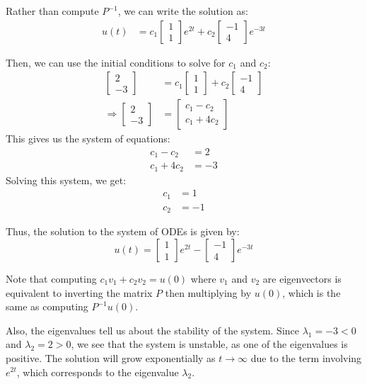 {Rather than compute $P^{-1}$, we can write the solution as:
\begin{align*}
u(t) &=
c_1 
\begin{bmatrix}
1 \\
1
\end{bmatrix}
e^{2t} +
c_2
\begin{bmatrix}
-1 \\
4
\end{bmatrix}
e^{-3t} \label{eq:general_solution}
\end{align*}

Then, we can use the initial conditions to solve for $c_1$ and $c_2$:
\begin{align*}
\begin{bmatrix}
2 \\
-3
\end{bmatrix} &=
c_1
\begin{bmatrix}
1 \\
1
\end{bmatrix} +
c_2
\begin{bmatrix}
-1 \\
4
\end{bmatrix} \\
\Rightarrow
\begin{bmatrix}
2 \\
-3
\end{bmatrix} &=
\begin{bmatrix}
c_1 - c_2 \\
c_1 + 4 c_2
\end{bmatrix}
\end{align*}
This gives us the system of equations:
\begin{align*}
c_1 - c_2 &= 2 \\
c_1 + 4 c_2 &= -3
\end{align*}
Solving this system, we get:
\begin{align*}
c_1 &= 1 \\
c_2 &= -1
\end{align*}

Thus, the solution to the system of ODEs is given by:
\begin{equation*}
u(t) =
\begin{bmatrix}
1 \\
1
\end{bmatrix}
e^{2t} -
\begin{bmatrix}
-1 \\
4
\end{bmatrix}
e^{-3t}
\end{equation*}

Note that computing $c_1 v_1 + c_2 v_2 = u(0)$ where $v_1$ and $v_2$ are eigenvectors is equivalent to inverting the matrix $P$ then multiplying by $u(0)$, which is the same as computing $P^{-1} u(0)$.

Also, the eigenvalues tell us about the stability of the system. Since $\lambda_1 = -3 < 0$ and $\lambda_2 = 2 > 0$, we see that the system is unstable, as one of the eigenvalues is positive. The solution will grow exponentially as $t \to \infty$ due to the term involving $e^{2t}$, which corresponds to the eigenvalue $\lambda_2$.

}

